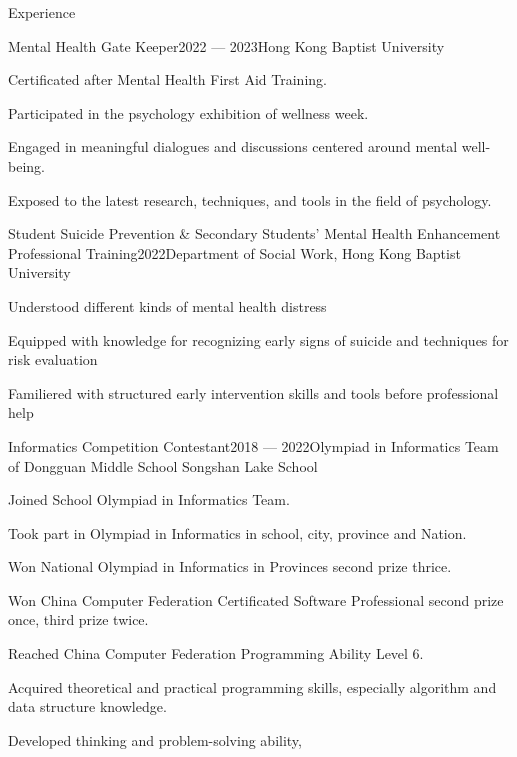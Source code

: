 \documentclass[
	11pt, %
]{resume} %
\begin{document}
\begin{rSection}{Experience}
    \begin{rSubsection}{Mental Health Gate Keeper}{2022 --- 2023}{Hong Kong Baptist University}{}
        \item Certificated after Mental Health First Aid Training.
        \item Participated in the psychology exhibition of wellness week.
        \item Engaged in meaningful dialogues and discussions centered around mental well-being.
        \item Exposed to the latest research, techniques, and tools in the field of psychology.
    \end{rSubsection}

    \begin{rSubsection}{Student Suicide Prevention \& Secondary Students' Mental Health Enhancement Professional Training}{2022}{Department of Social Work, Hong Kong Baptist University}{}
        \item Understood different kinds of mental health distress
        \item Equipped with knowledge  for recognizing early signs of suicide and techniques for risk evaluation
        \item Familiered with structured early intervention skills and tools before professional help
    \end{rSubsection}

    \begin{rSubsection}{Informatics Competition Contestant}{2018 --- 2022}{Olympiad in Informatics Team of Dongguan Middle School Songshan Lake School}{}
        \item Joined School Olympiad in Informatics Team.
        \item Took part in Olympiad in Informatics in school, city, province and Nation.
        \item Won National Olympiad in Informatics in Provinces second prize thrice.
        \item Won China Computer Federation Certificated Software Professional second prize once, third prize twice.
        \item Reached China Computer Federation Programming Ability Level 6.
        \item Acquired theoretical and practical programming skills, especially algorithm and data structure knowledge.
        \item Developed thinking and problem-solving ability,
    \end{rSubsection}

\end{rSection}
\end{document}
